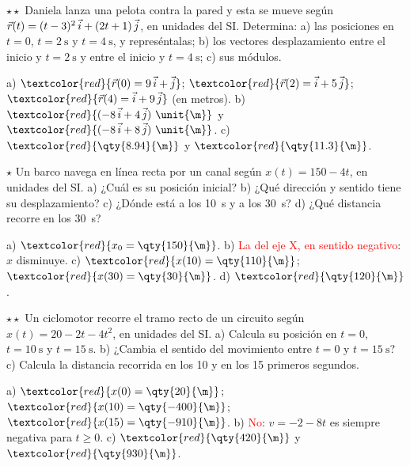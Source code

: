 \begin{exercise}
    \(\star\star\) Daniela lanza una pelota contra la pared y esta se mueve según \(\vec r(t) = (t - 3)^2\,\vec{i} + (2t + 1)\,\vec{j}\),
    en unidades del SI. Determina: a) las posiciones en \(t = 0\), \(t = \qty{2}{\s}\) y \(t = \qty{4}{\s}\), y represéntalas;
    b) los vectores desplazamiento entre el inicio y \(t = \qty{2}{\s}\) y entre el inicio y \(t = \qty{4}{\s}\); c) sus módulos.
    \begin{solu}
        a) \(\textcolor{red}{\vec r(0) = 9\,\ivec + \jvec}\); \(\textcolor{red}{\vec r(2) = \ivec + 5\,\jvec}\);
        \(\textcolor{red}{\vec r(4) = \ivec + 9\,\jvec}\) (en metros). b) \(\textcolor{red}{(-8\,\ivec + 4\,\jvec)~\unit{\m}}\) y
        \(\textcolor{red}{(-8\,\ivec + 8\,\jvec)~\unit{\m}}\). c) \(\textcolor{red}{\qty{8.94}{\m}}\) y \(\textcolor{red}{\qty{11.3}{\m}}\).
    \end{solu}
\end{exercise}

\begin{exercise}
    \(\star\) Un barco navega en línea recta por un canal según \(x(t) = 150 - 4t\), en unidades del SI. a) ¿Cuál es su posición
    inicial? b) ¿Qué dirección y sentido tiene su desplazamiento? c) ¿Dónde está a los \qty{10}{\s} y a los \qty{30}{\s}?
    d) ¿Qué distancia recorre en los \qty{30}{\s}?
    \begin{solu}
        a) \(\textcolor{red}{x_0 = \qty{150}{\m}}\). b) \textcolor{red}{La del eje X, en sentido negativo}: \(x\) disminuye.
        c) \(\textcolor{red}{x(10) = \qty{110}{\m}}\); \(\textcolor{red}{x(30) = \qty{30}{\m}}\). d) \(\textcolor{red}{\qty{120}{\m}}\).
    \end{solu}
\end{exercise}

\begin{exercise}
    \(\star\star\) Un ciclomotor recorre el tramo recto de un circuito según \(x(t) = 20 - 2t - 4t^2\), en unidades del SI.
    a) Calcula su posición en \(t = 0\), \(t = \qty{10}{\s}\) y \(t = \qty{15}{\s}\). b) ¿Cambia el sentido del movimiento entre
    \(t = 0\) y \(t = \qty{15}{\s}\)? c) Calcula la distancia recorrida en los 10 y en los 15 primeros segundos.
    \begin{solu}
        a) \(\textcolor{red}{x(0) = \qty{20}{\m}}\); \(\textcolor{red}{x(10) = \qty{-400}{\m}}\); \(\textcolor{red}{x(15) = \qty{-910}{\m}}\).
        b) \textcolor{red}{No}: \(v = -2 - 8t\) es siempre negativa para \(t \geq 0\). c) \(\textcolor{red}{\qty{420}{\m}}\) y
        \(\textcolor{red}{\qty{930}{\m}}\).
    \end{solu}
\end{exercise}

